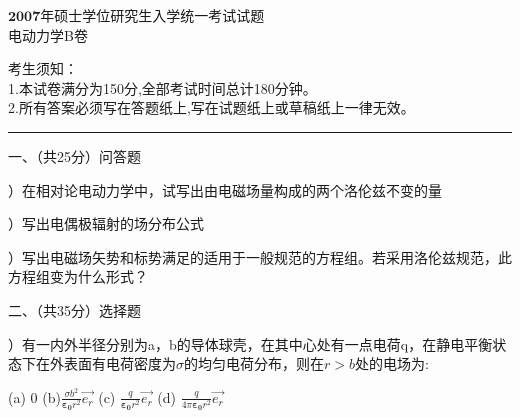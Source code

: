\begin{center}
	\heiti
	\LARGE{$\boldsymbol{2007}$年硕士学位研究生入学统一考试试题\\
	电动力学B卷}

\end{center}
\noindent
考生须知：\\
1.本试卷满分为150分,全部考试时间总计180分钟。\\
2.所有答案必须写在答题纸上,写在试题纸上或草稿纸上一律无效。

\vspace*{2ex}
\hrule
\vspace*{4ex}


\setcounter{page}{1}%
\pagestyle{mypagestyle}

\onehalfspacing
\vspace{0.4cm}
\noindent
一、（共25分）问答题

）\hspace{0.2em}在相对论电动力学中，试写出由电磁场量构成的两个洛伦兹不变的量

）\hspace{0.2em}写出电偶极辐射的场分布公式

）\hspace{0.2em}写出电磁场矢势和标势满足的适用于一般规范的方程组。\quad 若采用洛伦兹规范，此方程组变为什么形式？

\vspace{0.5cm}
\noindent
二、（共35分）选择题

）\hspace{0.2em}有一内外半径分别为a，b的导体球壳，在其中心处有一点电荷q，在静电平衡状态下在外表面有电荷密度为$\sigma$的均匀电荷分布，则在$r > b$处的电场为:

\vspace{0.2cm}
(a)\hspace{0.6em} 0 \hspace{1.4em}
(b)\hspace{0.6em}$ \displaystyle{\frac{\sigma b^2}{\boldsymbol{\varepsilon_0} r^2} \Vec{e_r}}$\hspace{1.4em}
(c)\hspace{0.6em} $\displaystyle{\frac{q}{\boldsymbol{\varepsilon_0} r^2} \Vec{e_r}}$\hspace{1.4em}
(d)\hspace{0.6em} $\displaystyle{\frac{q}{4 \pi \boldsymbol{\varepsilon_0} r^2} \Vec{e_r}}$
\vspace{0.2cm}

